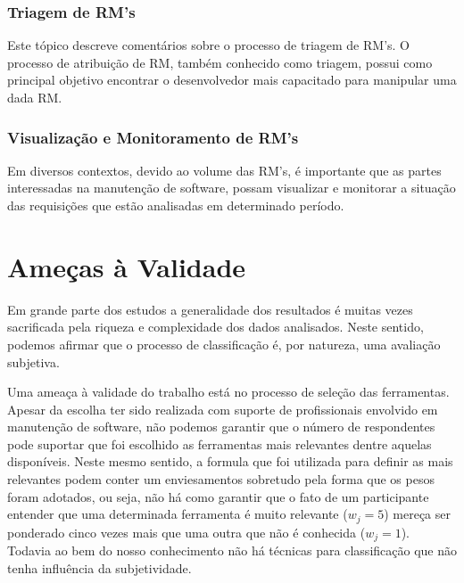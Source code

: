 \subsubsection{Triagem de RM's}

Este tópico descreve comentários sobre o processo de triagem de RM's. O processo
de atribuição de RM, também conhecido como triagem, possui como principal
objetivo encontrar o desenvolvedor mais capacitado para manipular uma dada RM\@.

\subsubsection{Visualização e Monitoramento de RM's}

Em diversos contextos, devido ao volume das RM's, é importante que as partes
interessadas na manutenção de software, possam visualizar e monitorar a situação
das requisições que estão analisadas em determinado período.




\section{Ameças à Validade}
\label{sec:ameacas_a_validade}

Em grande parte dos estudos a generalidade dos resultados é muitas vezes
sacrificada pela riqueza e complexidade dos dados analisados. Neste sentido,
podemos afirmar que o processo de classificação é, por natureza, uma avaliação
subjetiva.

Uma ameaça à validade do trabalho está no processo de seleção das ferramentas.
Apesar da escolha ter sido realizada com suporte de profissionais envolvido em
manutenção de software, não podemos garantir que o número de respondentes pode
suportar que foi escolhido as ferramentas mais relevantes dentre aquelas
disponíveis. Neste mesmo sentido, a formula que foi utilizada para definir as
mais relevantes podem conter um enviesamentos sobretudo pela forma que os pesos
foram adotados, ou seja, não há como garantir que o fato de um participante
entender que uma determinada ferramenta é muito relevante ($w_j = 5$) mereça ser
ponderado cinco vezes mais que uma outra que não é conhecida ($w_j = 1$).
Todavia ao bem do nosso conhecimento não há técnicas para classificação que não
tenha influência da subjetividade.

